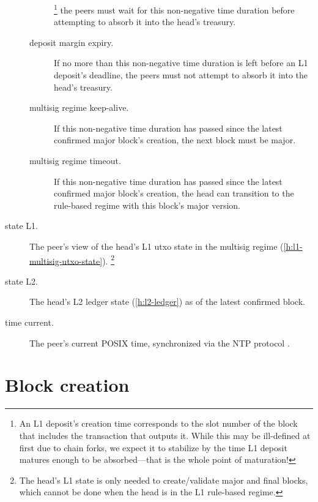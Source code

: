 \documentclass[../hydrozoa.tex]{subfiles}
\begin{document}
\begin{description}
\begin{description}
        \footnote{An L1 deposit's creation time corresponds to the slot number of the block that includes the transaction that outputs it.
          While this may be ill-defined at first due to chain forks, we expect it to stabilize by the time L1 deposit matures enough to be absorbed---that is the whole point of maturation!}
        the peers must wait for this non-negative time duration before attempting to absorb it into the head's treasury.
      \item[deposit margin expiry.] If no more than this non-negative time duration is left before an L1 deposit's deadline, the peers must not attempt to absorb it into the head's treasury.
      \item[multisig regime keep-alive.] If this non-negative time duration has passed since the latest confirmed major block's creation, the next block must be major.
      \item[multisig regime timeout.] If this non-negative time duration has passed since the latest confirmed major block's creation, the head can transition to the rule-based regime with this block's major version.
    \end{description}
  \item[state L1.] The peer's view of the head's L1 utxo state in the multisig regime (\cref{h:l1-multisig-utxo-state}).%
    \footnote{The head's L1 state is only needed to create/validate major and final blocks, which cannot be done when the head is in the L1 rule-based regime.}
  \item[state L2.] The head's L2 ledger state (\cref{h:l2-ledger}) as of the latest confirmed block.
  \item[time current.] The peer's current POSIX time, synchronized via the NTP protocol \citep{MillsEtAlNetworkTimeProtocol2010}.
\end{description}

\section{Block creation}%
\label{h:l2-block-creation}%
\end{document}
